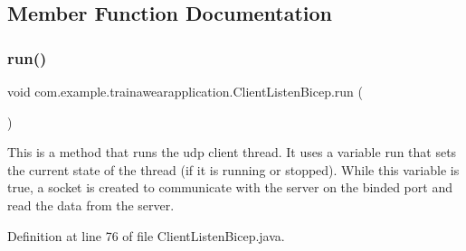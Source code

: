 \subsection{Member Function Documentation}
\mbox{\label{classcom_1_1example_1_1trainawearapplication_1_1_client_listen_bicep_a00c62e73027050af19a527f480a9be15}} 
\subsubsection{\texorpdfstring{run()}{run()}}
{\footnotesize\ttfamily void com.\+example.\+trainawearapplication.\+Client\+Listen\+Bicep.\+run (\begin{DoxyParamCaption}{ }\end{DoxyParamCaption})\hspace{0.3cm}{\ttfamily [inline]}}

This is a method that runs the udp client thread. It uses a variable run that sets the current state of the thread (if it is running or stopped). While this variable is true, a socket is created to communicate with the server on the binded port and read the data from the server.

Definition at line 76 of file Client\+Listen\+Bicep.\+java.


